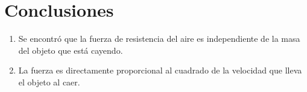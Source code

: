 \section{Conclusiones}

\begin{enumerate}
    \item Se encontró que la fuerza de resistencia del aire es
        independiente de la masa del objeto que está cayendo.
    \item La fuerza es directamente proporcional al cuadrado de 
        la velocidad que lleva el objeto al caer.
\end{enumerate}
